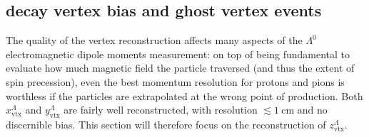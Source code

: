 \subsection{\texorpdfstring{\lz}{Lambda} decay vertex bias and ghost vertex events}
\label{sec:lambda_endvertex_bias}

The quality of the \lambdadecay vertex reconstruction affects many aspects of the $\Lambda^0$ electromagnetic dipole moments measurement:
on top of being fundamental to evaluate how much magnetic field the particle traversed (and thus the extent of spin precession), even the best momentum resolution for protons and pions is worthless if the particles are extrapolated at the wrong point of production.
Both $x_\text{vtx}^\Lambda$ and $y_\text{vtx}^\Lambda$ are fairly well reconstructed, with resolution $\lesssim \SI{1}{\centi\meter}$ and no discernible bias.
This section will therefore focus on the reconstruction of $z_\text{vtx}^\Lambda$.

